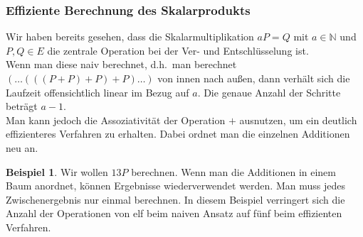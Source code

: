 \documentclass[hidelinks]{article}
\theoremstyle{plain}
\theoremstyle{definition}
\newtheorem{bsp}[thm]{Beispiel}
\theoremstyle{rem}
\begin{document}
\begin{sloppypar}
\subsubsection{Effiziente Berechnung des Skalarprodukts}
Wir haben bereits gesehen, dass die Skalarmultiplikation $aP = Q$ mit $a \in \mathbb{N}$ und $P, Q \in E$ die zentrale Operation bei der Ver- und Entschlüsselung ist. \\
Wenn man diese naiv berechnet, d.h.\ man berechnet $(\dots (((P + P) + P) + P) \dots )$ von innen nach außen, dann verhält sich die Laufzeit offensichtlich linear im Bezug auf $a$. Die genaue Anzahl der Schritte beträgt $a-1$. \\
Man kann jedoch die Assoziativität der Operation $+$ ausnutzen, um ein deutlich effizienteres Verfahren zu erhalten. Dabei ordnet man die einzelnen Additionen neu an.
\begin{bsp}
    Wir wollen $13P$ berechnen.
    Wenn man die Additionen in einem Baum anordnet, können Ergebnisse wiederverwendet werden. Man muss jedes Zwischenergebnis nur einmal berechnen. In diesem Beispiel verringert sich die Anzahl der Operationen von elf beim naiven Ansatz auf fünf beim effizienten Verfahren.
    \begin{figure}[H]
        \centering
\end{figure}
\end{bsp}
\end{sloppypar}
\end{document}
